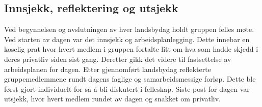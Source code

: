 \subsection{Innsjekk, reflektering og utsjekk}

Ved begynnelsen og avslutningen av hver landsbydag holdt gruppen felles møte.
Ved starten av dagen var det innsjekk og arbeidsplanlegging.
Dette innebar en koselig prat hvor hvert medlem i gruppen fortalte litt om hva som hadde skjedd i deres privatliv siden sist gang.
Deretter gikk det videre til fastsettelse av arbeidsplanen for dagen.
Etter gjennomført landsbydag reflekterte gruppemedlemmene rundt dagens faglige og samarbeidsmessige forløp.
Dette ble først gjort individuelt for så å bli diskutert i felleskap.
Siste post for dagen var utsjekk, hvor hvert medlem rundet av dagen og snakket om privatliv.